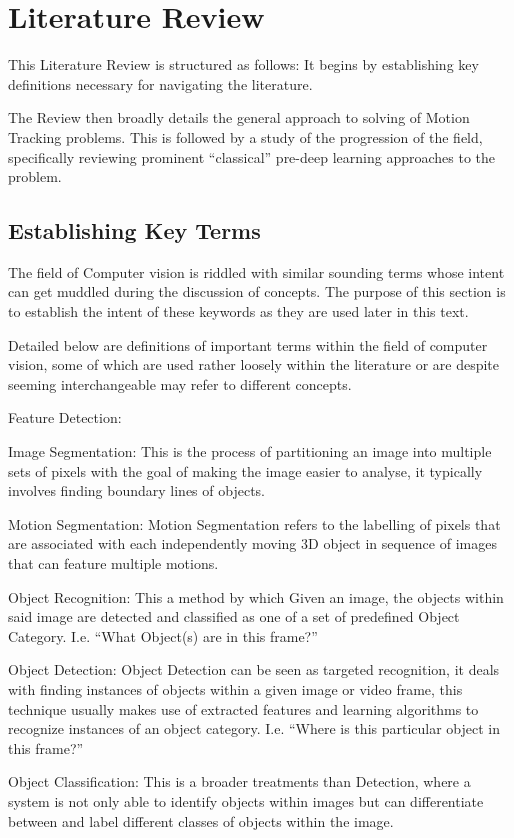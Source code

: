 \chapter{Literature Review} \label{chapter_literature_review}
This Literature Review is structured as follows: It begins by establishing key
definitions necessary for navigating the literature.

The Review then broadly details the general approach to solving of Motion Tracking
problems. This is followed by a study of the progression of the field,
specifically reviewing prominent “classical” pre-deep learning approaches to the
problem.

\section{Establishing Key Terms}
The field of Computer vision is riddled with similar sounding terms whose intent
can get muddled during the discussion of concepts.  The purpose of this section
is to establish the intent of these keywords as they are used later in this text.

Detailed below are definitions of important terms within the field of computer
vision, some of which are used rather loosely within the literature or are
despite seeming interchangeable may refer to different concepts. 

Feature Detection:

Image Segmentation: This is the process of partitioning an image into multiple
sets of pixels with the goal of making the image easier to analyse, it typically
involves finding boundary lines of objects. 

Motion Segmentation: Motion Segmentation refers to the labelling of pixels that
are associated with each independently moving 3D object in sequence of images
that can feature multiple motions.~\cite{Tekalp2014}

Object Recognition: This a method by which Given an image, the objects within
said image are detected and classified as one of a set of predefined Object
Category.  I.e. “What Object(s) are in this frame?”

Object Detection: Object Detection can be seen as targeted recognition, it deals
with finding instances of objects within a given image or video frame, this
technique usually makes use of extracted features and learning algorithms to
recognize instances of an object category.  I.e. “Where is this particular
object in this frame?”

Object Classification: This is a broader treatments than Detection, where a
system is not only able to identify objects within images but can differentiate
between and label different classes of objects within the image. 

